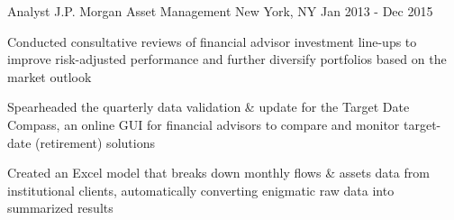\begin{cventries}
  \cventry
    {Analyst} %
    {J.P. Morgan Asset Management} %
    {New York, NY} %
    {Jan 2013 - Dec 2015} %
    {
      \begin{cvitems} %
        \item {Conducted consultative reviews of financial advisor investment line-ups to improve risk-adjusted performance and further diversify portfolios based on the market outlook}
        \item {Spearheaded the quarterly data validation \& update for the Target Date Compass, an online GUI for financial advisors to compare and monitor target-date (retirement) solutions}
        \item {Created an Excel model that breaks down monthly flows \& assets data from institutional clients, automatically converting enigmatic raw data into summarized results}
      \end{cvitems}
    }

\end{cventries}
